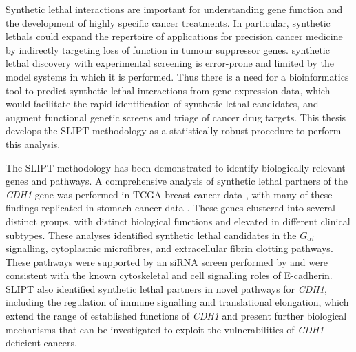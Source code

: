 Synthetic lethal interactions are important for understanding gene function and the development of highly specific  cancer \glspl{treatment}. In particular, \glspl{synthetic lethal} could expand the repertoire of applications for precision cancer medicine by indirectly targeting loss of function in \gls{tumour suppressor} genes.  \Gls{synthetic lethal} discovery with experimental screening is error-prone and limited by the model systems in which it is performed. Thus there is a need for a \gls{bioinformatics} tool to predict \gls{synthetic lethal} interactions from \gls{gene expression} data, which would facilitate the rapid identification of \gls{synthetic lethal} candidates, and augment functional genetic screens and triage of cancer drug targets. This thesis develops the \acrfull{SLIPT} methodology as a statistically robust procedure to perform this analysis.

The \gls{SLIPT} methodology has been demonstrated to identify biologically relevant genes and pathways. A comprehensive analysis of \gls{synthetic lethal} partners of the \textit{CDH1} gene was performed in \gls{TCGA} breast cancer data \citep{TCGA2012}, with many of these findings replicated in stomach cancer data \citep{TCGA2014GC}. These genes clustered into several distinct groups, with distinct biological functions and elevated  in different clinical subtypes.  These analyses identified \gls{synthetic lethal} candidates in the $G_{\alpha i}$ signalling, cytoplasmic microfibres, and extracellular fibrin clotting pathways. These \glspl{pathway} were supported by an \gls{siRNA} screen performed by \citet{Telford2015} and were consistent with the known cytoskeletal and cell signalling roles of \gls{E-cadherin}. 
\gls{SLIPT} also identified \gls{synthetic lethal} partners in novel pathways for \textit{CDH1}, including the regulation of immune signalling and translational elongation, which extend the range of established functions of \textit{CDH1} and present further biological mechanisms %
that can be investigated to exploit the
vulnerabilities of \textit{CDH1}-deficient cancers.

